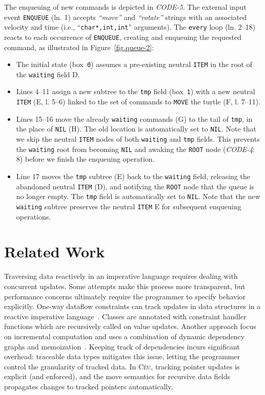 \documentclass{sig-alternate}
\newcommand{\CEU}{\textsc{C\'{e}u}\xspace}
\newcommand{\code}[1] {{\small{\texttt{#1}}}}
\newcommand{\MM}[1] {\textcircled{\tiny{\textsf{#1}}}}
\begin{document}
The enqueuing of new commands is depicted in \emph{CODE-5}.
The external input event \code{ENQUEUE} (ln. 1) accepts \emph{``move''} and 
\emph{``rotate''} strings with an associated velocity and time (i.e., 
``\code{char*,int,int}'' arguments).
The \code{every} loop (ln. 2--18) reacts to each occurrence of 
\code{ENQUEUE}, creating and enqueuing the requested command, as illustrated in 
Figure~\ref{fig.queue-2}: 
%
\begin{itemize}
%
\item The initial state (box~\code{0}) assumes a pre-existing neutral 
\code{ITEM} in the root of the \code{waiting} field \MM{D}.
%
\item Lines 4--11 assign a new subtree to the \code{tmp} field (box~\code{1}) 
with a new neutral \code{ITEM} (\MM{E}, l. 5--6) linked to the set of 
commands to \code{MOVE} the turtle (\MM{F}, l. 7--11).
%
\item Lines 15--16 move the already \code{waiting} commands (\MM{G}) to the 
tail of \code{tmp}, in the place of \code{NIL} (\MM{H}).
The old location is automatically set to \code{NIL}.
Note that we skip the neutral \code{ITEM} nodes of both \code{waiting} and 
\code{tmp} fields.
This prevents the \code{waiting} root from becoming \code{NIL} and awaking the 
\code{ROOT} node (\emph{CODE-4}: 8) before we finish the enqueuing operation.
%
\item Line 17 moves the \code{tmp} subtree (\MM{E}) back to the \code{waiting} 
field, releasing the abandoned neutral \code{ITEM} (\MM{D}), and notifying the 
\code{ROOT} node that the queue is no longer empty.
The \code{tmp} field is automatically set to \code{NIL}.
Note that the new \code{waiting} subtree preserves the neutral \code{ITEM} 
\MM{E} for subsequent enqueuing operations.
%
\end{itemize}

\section{Related Work}
\label{sec.related}

Traversing data reactively in an imperative language requires dealing with 
concurrent updates.
Some attempts make this process more transparent, but performance concerns 
ultimately require the programmer to specify behavior explicitly.
%
One-way dataflow constraints can track updates in data structures in a reactive 
imperative language~\cite{ripdataflow}.
Classes are annotated with constraint handler functions which are recursively 
called on value updates.
%
Another approach focus on incremental computation and uses a combination of 
dynamic dependency graphs and memoization~\cite{selfadjusting}.
Keeping track of dependencies incurs significant overhead: traceable data types
\cite{traceable} mitigates this issue, letting the programmer control the 
granularity of tracked data.
%
In \CEU, tracking pointer updates is explicit (and enforced), and the move 
semantics for recursive data fields propagates changes to tracked pointers 
automatically.
\end{document}
